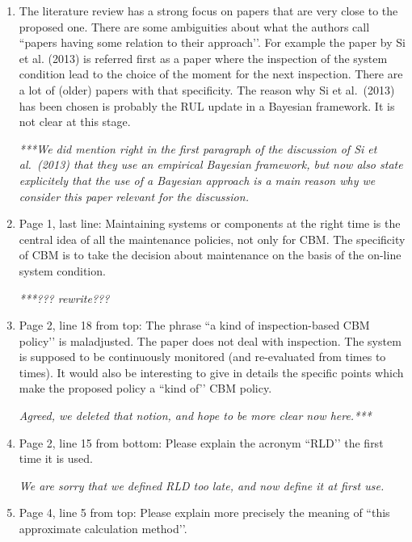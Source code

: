 \documentclass[authoryear]{elsarticle}
\begin{document}
\begin{enumerate}
\item The literature review has a strong focus on papers that are very close to the proposed one. There are some ambiguities about what the authors call ``papers having some relation to their approach’’. For example the paper by Si et al. (2013) is referred first as a paper where the inspection of the system condition lead to the choice of the moment for the next inspection. There are a lot of (older) papers with that specificity. The reason why Si et al.~(2013) has been chosen is probably the RUL update in a Bayesian framework. It is not clear at this stage.

\smallskip

\emph{***We did mention right in the first paragraph of the discussion of Si et al.~(2013)
that they use an empirical Bayesian framework,
but now also state explicitely that the use of a Bayesian approach is a main reason why we consider this paper relevant for the discussion.}

\item Page 1, last line: Maintaining systems or components at the right time is the central idea of all the maintenance policies, not only for CBM. The specificity of CBM is to take the decision about maintenance on the basis of the on-line system condition. 

\smallskip

\emph{***??? rewrite???}

\item Page 2, line 18 from top: The phrase ``a kind of inspection-based CBM policy’’ is maladjusted. The paper does not deal with inspection. The system is supposed to be continuously monitored (and re-evaluated from times to times). It would also be interesting to give in details the specific points which make the proposed policy a ``kind of’’ CBM policy.

\smallskip

\emph{Agreed, we deleted that notion, and hope to be more clear now here.***}

\item Page 2, line 15 from bottom: Please explain the acronym ``RLD’’ the first time it is used. 

\smallskip

\emph{We are sorry that we defined RLD too late, and now define it at first use.}

\item Page 4, line 5 from top: Please explain more precisely the meaning of ``this approximate calculation method’’.


\end{enumerate}
\end{document}
